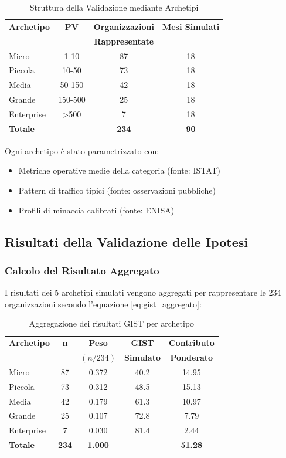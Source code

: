 \begin{table}[h!]
\centering
\caption{Struttura della Validazione mediante Archetipi}
\begin{tabular}{|l|c|c|c|}
\hline
\textbf{Archetipo} & \textbf{PV} & \textbf{Organizzazioni} & \textbf{Mesi Simulati} \\
                   &             & \textbf{Rappresentate} & \\
\hline
Micro & 1-10 & 87 & 18 \\
Piccola & 10-50 & 73 & 18 \\
Media & 50-150 & 42 & 18 \\
Grande & 150-500 & 25 & 18 \\
Enterprise & >500 & 7 & 18 \\
\hline
\textbf{Totale} & - & \textbf{234} & \textbf{90} \\
\hline
\end{tabular}
\end{table}

Ogni archetipo è stato parametrizzato con:
\begin{itemize}
\item Metriche operative medie della categoria (fonte: ISTAT)
\item Pattern di traffico tipici (fonte: osservazioni pubbliche)
\item Profili di minaccia calibrati (fonte: ENISA)
\end{itemize}

\subsection{\texorpdfstring{Risultati della Validazione delle Ipotesi}{5.2.2 - Risultati della Validazione delle Ipotesi}}
\label{subsec:5.2.2}

\subsubsection{Calcolo del Risultato Aggregato}

I risultati dei 5 archetipi simulati vengono aggregati per rappresentare le 234 organizzazioni secondo l'equazione \ref{eq:gist_aggregato}:

\begin{table}[h!]
\centering
\caption{Aggregazione dei risultati GIST per archetipo}
\begin{tabular}{|l|c|c|c|c|}
\hline
\textbf{Archetipo} & \textbf{n} & \textbf{Peso} & \textbf{GIST} & \textbf{Contributo} \\
 & & $(n/234)$ & \textbf{Simulato} & \textbf{Ponderato} \\
\hline
Micro & 87 & 0.372 & 40.2 & 14.95 \\
Piccola & 73 & 0.312 & 48.5 & 15.13 \\
Media & 42 & 0.179 & 61.3 & 10.97 \\
Grande & 25 & 0.107 & 72.8 & 7.79 \\
Enterprise & 7 & 0.030 & 81.4 & 2.44 \\
\hline
\textbf{Totale} & \textbf{234} & \textbf{1.000} & - & \textbf{51.28} \\
\hline
\end{tabular}
\end{table}

